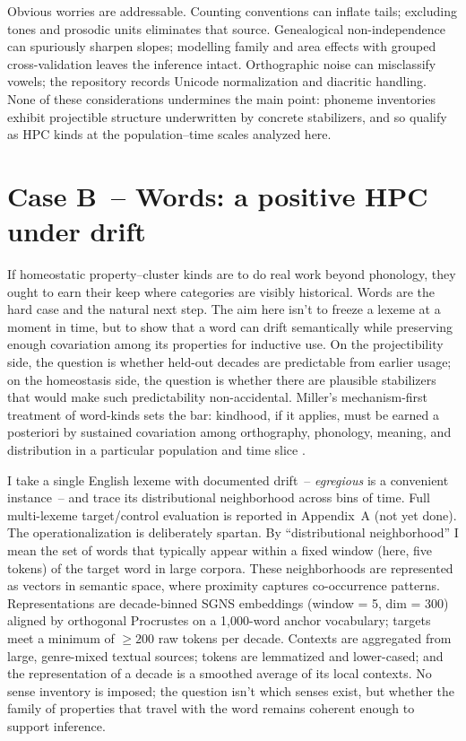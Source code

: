 \documentclass[12pt]{article}
\begin{document}
Obvious worries are addressable. Counting conventions can inflate tails; excluding tones and prosodic units eliminates that source. Genealogical non-independence can spuriously sharpen slopes; modelling family and area effects with grouped cross-validation leaves the inference intact. Orthographic noise can misclassify vowels; the repository records Unicode normalization and diacritic handling. None of these considerations undermines the main point: phoneme inventories exhibit projectible structure underwritten by concrete stabilizers, and so qualify as \textsc{HPC} kinds at the population–time scales analyzed here.

\section{Case B~-- Words: a positive HPC under drift}\label{sec:case-word}

If homeostatic property–cluster kinds are to do real work beyond phonology, they ought to earn their keep where categories are visibly historical. Words are the hard case and the natural next step. The aim here isn't to freeze a lexeme at a moment in time, but to show that a word can drift semantically while preserving enough covariation among its properties for inductive use. On the projectibility side, the question is whether held-out decades are predictable from earlier usage; on the homeostasis side, the question is whether there are plausible stabilizers that would make such predictability non-accidental. Miller's mechanism-first treatment of word-kinds sets the bar: kindhood, if it applies, must be earned a posteriori by sustained covariation among orthography, phonology, meaning, and distribution in a particular population and time slice \citep{Miller2021WordsSpeciesKinds}.

I take a single English lexeme with documented drift~-- \textit{egregious} is a convenient instance~-- and trace its distributional neighborhood across bins of time. Full multi-lexeme target/control evaluation is reported in Appendix~A (not yet done). The operationalization is deliberately spartan. By \enquote{distributional neighborhood} I mean the set of words that typically appear within a fixed window (here, five tokens) of the target word in large corpora. These neighborhoods are represented as vectors in semantic space, where proximity captures co-occurrence patterns. Representations are decade-binned SGNS embeddings (window = 5, dim = 300) aligned by orthogonal Procrustes on a 1,000-word anchor vocabulary; targets meet a minimum of $\geq200$ raw tokens per decade. Contexts are aggregated from large, genre-mixed textual sources; tokens are lemmatized and lower-cased; and the representation of a decade is a smoothed average of its local contexts. No sense inventory is imposed; the question isn't which senses exist, but whether the family of properties that travel with the word remains coherent enough to support inference. 
\end{document}
